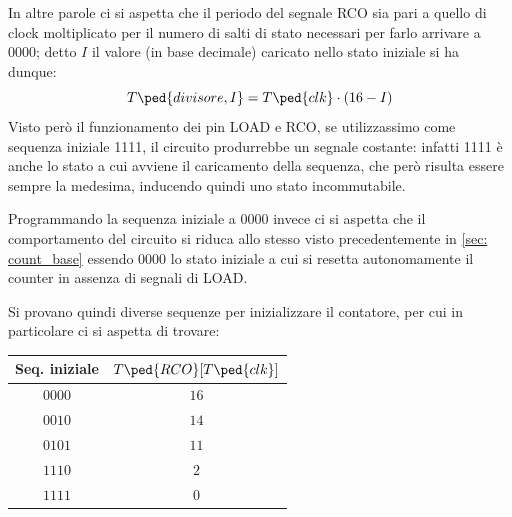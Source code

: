 \documentclass[10pt, a4paper, italian]{article}
\begin{document}
In altre parole ci si aspetta che il periodo del segnale RCO sia pari a
quello di clock moltiplicato per il numero di salti di stato necessari per
farlo arrivare a 0000; detto $I$ il valore (in base decimale) caricato nello
stato iniziale si ha dunque:
\begin{equation}
T\ped{divisore, I} = T\ped{clk} \cdot (16 - I)
\end{equation}
Visto però il funzionamento dei pin LOAD e RCO, se utilizzassimo come sequenza
iniziale 1111, il circuito produrrebbe un segnale costante: infatti 1111 è
anche lo stato a cui avviene il caricamento della sequenza, che però risulta
essere sempre la medesima, inducendo quindi uno stato incommutabile.

Programmando la sequenza iniziale a $0000$ invece ci si aspetta che il
comportamento del circuito si riduca allo stesso visto precedentemente in
\cref{sec: count_base} essendo 0000 lo stato iniziale a cui si resetta
autonomamente il counter in assenza di segnali di LOAD.

Si provano quindi diverse sequenze per inizializzare il contatore, per cui
in particolare ci si aspetta di trovare:
\begin{table}[htbp]
\centering
\begin{tabular}{c|c}
\toprule
Seq. iniziale & $T\ped{RCO} [T\ped{clk}]$\\
\midrule
$0000$ & $16$ \\
$0010$ & $14$ \\
$0101$ & $11$ \\
$1110$ & $2$ \\
$1111$ & $0$ \\
\bottomrule
\end{tabular}
\end{table}
\end{document}
